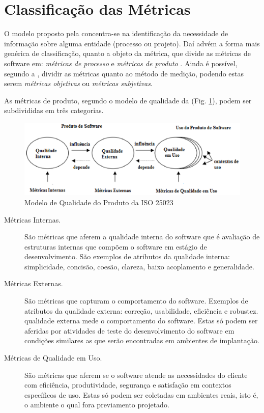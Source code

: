 	\section{Classificação das Métricas}	
	\label {Classificação das Métricas}
	O modelo proposto pela  concentra-se na identificação da necessidade de informação sobre alguma entidade (processo ou projeto). Daí advém a forma mais genérica de classificação, quanto a objeto da métrica, que divide as métricas de software em: \textit{métricas de processo} e \textit{métricas de produto} \cite{Mills:1999}. Ainda é possível, segundo a , dividir as métricas quanto ao método de medição, podendo estas serem \textit{métricas objetivas} ou \textit{métricas subjetivas}.
	
	As métricas de produto, segundo o modelo de qualidade da  (Fig. \ref{modelodequalidade}), podem ser subdivididas em três categorias. 
				
	\begin{figure}[h]
		\centering
			\includegraphics[keepaspectratio=false,scale=1.0]{figuras/modelodequalidade.eps}
		\caption{Modelo de Qualidade do Produto da ISO 25023}
		\label{modelodequalidade}
	\end{figure}
			
		\begin{description}
		\item[Métricas Internas.] 
		São métricas que aferem a qualidade interna do software que é avaliação de estruturas internas que compõem o software em estágio de desenvolvimento.  São exemplos de atributos da qualidade interna: simplicidade, concisão, coesão, clareza, baixo acoplamento e generalidade. 
			
		\item[Métricas Externas.]
		São métricas que capturam o comportamento do software. Exemplos de atributos da qualidade externa: correção, usabilidade, eficiência e robustez. qualidade externa mede  o comportamento do software. Estas só podem ser aferidas por atividades de teste do desenvolvimento do software em condições similares as que serão encontradas em ambientes de implantação.
			
		\item[Métricas de Qualidade em Uso.]
		 São métricas que aferem se o software atende as necessidades do cliente com eficiência, produtividade, segurança e satisfação em contextos específicos de uso. Estas só podem ser coletadas em ambientes reais, isto é, o ambiente o qual fora previamento projetado.
			 
		\end{description}
		


